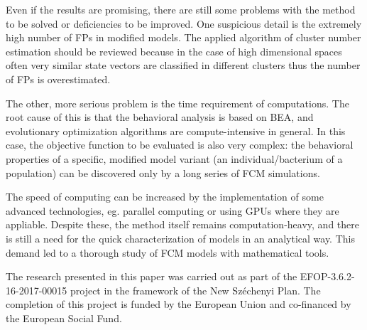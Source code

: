\documentclass[graybox]{svmult}
\begin{document}
Even if the results are promising, there are still some problems with the method to be solved or deficiencies to be improved. One suspicious detail is the extremely high number of FPs in modified models. The applied algorithm of cluster number estimation should be reviewed because in the case of high dimensional spaces often very similar state vectors are classified in different clusters thus the number of FPs is overestimated.

The other, more serious problem is the time requirement of computations. The root cause of this is that the behavioral analysis is based on BEA, and evolutionary optimization algorithms are compute-intensive in general. In this case, the objective function to be evaluated is also very complex: the behavioral properties of a specific, modified model variant (an individual/bacterium of a population) can be discovered only by a long series of FCM simulations.

The speed of computing can be increased by the implementation of some advanced technologies, eg. parallel computing or using GPUs where they are appliable. Despite these, the method itself remains computation-heavy, and there is still a need for the quick characterization of models in an analytical way. This demand led to a thorough study of FCM models with mathematical tools.

\begin{acknowledgement}
The research presented in this paper was carried out as part of the EFOP-3.6.2-16-2017-00015 project in the framework of the New Széchenyi Plan. The completion of this project is funded by the European Union and co-financed by the European Social Fund.
\end{acknowledgement}


\end{document}
